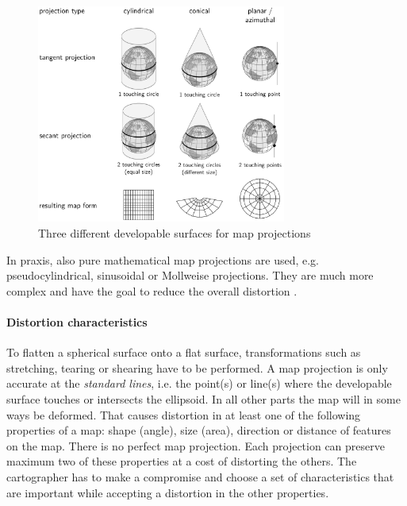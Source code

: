 \begin{figure}[ht]
  \centering
  \includegraphics[width=0.73\textwidth]{graphics/basics/projections}
  \caption{Three different developable surfaces for map projections \protect\footnotemark}
  \label{fig:projections}
\end{figure}


In praxis, also pure mathematical map projections are used, e.g. pseudocylindrical, sinusoidal or Mollweise projections. They are much more complex and have the goal to reduce the overall distortion
\cite[p.99]{bolstad2008gis}.



\paragraph{Distortion characteristics} %
\label{par:distortion_characteristics}

To flatten a spherical surface onto a flat surface, transformations such as stretching, tearing or shearing have to be performed. %
A map projection is only accurate at the \emph{standard lines}, i.e. the point(s) or line(s) where the developable surface touches or intersects the ellipsoid. In all other parts the map will in some ways be deformed. That causes distortion in at least one of the following properties of a map: shape (angle), size (area),  direction or distance of features on the map. There is no perfect map projection. Each projection can preserve maximum two of these properties at a cost of distorting the others. The cartographer has to make a compromise and choose a set of characteristics that are important while accepting a distortion in the other properties.


